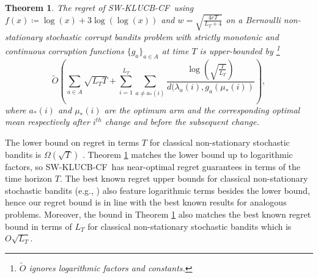 \documentclass[letterpaper]{article} %
\newcommand{\defined}{\coloneqq}
\newcommand{\SWKLUCBCF}{\textsc{SW-KLUCB-CF}}
\newcommand{\optMeanAtIChanges}[1]{\mu_{*}(#1)}
\newcommand{\MeanFeAtIChanges}[2]{\lambda_#1(#2)}
\newcommand{\optArmAtIChanges}[1]{a_{*}(#1)}
\newcommand{\numChanges}{L}
\newcommand{\windowsize}{w}
\newtheorem{myTheorem}{Theorem}
\begin{document}
\begin{myTheorem}
\label{MainTheorem1}
The regret of \SWKLUCBCF \ using  $f(x) \defined \log(x)+3\log(\log(x))$ and $\windowsize = \sqrt{ \frac{4eT}{\numChanges_T + 4}}$ on a
Bernoulli non-stationary stochastic corrupt bandits problem with strictly monotonic and continuous corruption functions $\{g_a\}_{a \in A}$ at time $T$ is upper-bounded by \footnote{$\tilde{O}$ ignores logarithmic factors and constants.}
$$
\tilde{O}\left( \sum_{a \in A} \sqrt{\numChanges_T T} + \sum_{i=1}^{\numChanges_T} \sum_{a \neq \optArmAtIChanges{i}} \frac{\log{\left(  \sqrt{ \frac{T}{\numChanges_T}} \right)}}{d(\MeanFeAtIChanges{a}{i},g_a(\optMeanAtIChanges{i})} \right),
$$
where $\optArmAtIChanges{i}$ and $\optMeanAtIChanges{i}$ are the optimum arm and the corresponding optimal mean respectively after $i^{th}$ change and before the subsequent change.
\end{myTheorem}

The lower bound on regret in terms $T$ for classical non-stationary stochastic bandits is $\Omega(\sqrt{T})$ \citep{GarivierSW}. Theorem \ref{MainTheorem1} matches the lower bound up to logarithmic factors, so \SWKLUCBCF \ has near-optimal regret guarantees in terms of the time horizon $T$. The best known regret upper bounds for classical non-stationary stochastic bandits (e.g., \citet{pmlr-v99-auer19a}) also feature logarithmic terms besides the lower bound, hence our regret bound is in line with the best known results for analogous problems.
Moreover, the bound in Theorem \ref{MainTheorem1} also matches the best known regret bound in terms of $\numChanges_T$ for classical non-stationary stochastic bandits which is $O\sqrt{\numChanges_T}$.
\end{document}
